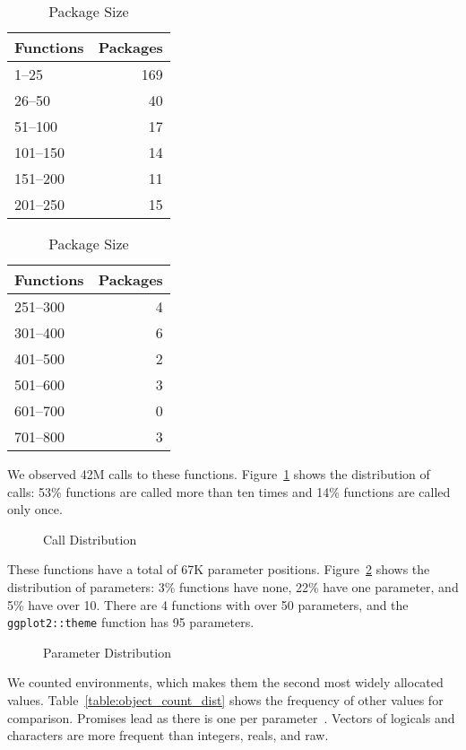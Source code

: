 \documentclass[10pt,review,sigplan,authorversion=true]{acmart}
\begin{document}
\begin{table}[!h]    \small
  \caption{Package Size} \label{table:packsize}  \centering
  \begin{tabular}{lr}    \toprule
    \bf Functions&\bf Packages\\    \midrule
    1--25&169\\
    26--50&40\\
    51--100&17\\
    101--150&14\\
    151--200&11\\
    201--250&15\\    \bottomrule
  \end{tabular}
  \quad
  \begin{tabular}{lr}    \toprule
    \bf Functions&\bf Packages\\    \midrule
    251--300&4\\
    301--400&6\\
    401--500&2\\
    501--600&3\\
    601--700&0\\
    701--800&3\\    \bottomrule
  \end{tabular}
\end{table}

\noindent
We observed 42M calls to these functions. Figure~\ref{fig:calldist} shows the
distribution of calls: 53\% functions are called more than ten times and 14\%
functions are called only once.

\begin{figure}[!h]
  \centering
  
  \caption{Call Distribution}
  \label{fig:calldist}
\end{figure}

\noindent
These functions have a total of 67K parameter positions.
Figure~\ref{fig:paramdist} shows the distribution of parameters: 3\% functions
have none, 22\% have one parameter, and 5\% have over 10. There are 4 functions
with over 50 parameters, and the \texttt{ggplot2::theme} function has 95
parameters.

\begin{figure}[!h]  \centering
  
  \caption{Parameter Distribution}
  \label{fig:paramdist}
\end{figure}

We counted \ObjCntEnvironment environments, which makes them the second most
widely allocated values. Table~\ref{table:object_count_dist} shows the frequency
of other values for comparison. Promises lead as there is one per
parameter~\cite{oopsla19b}. Vectors of logicals and characters are more frequent
than integers, reals, and raw.
\end{document}
